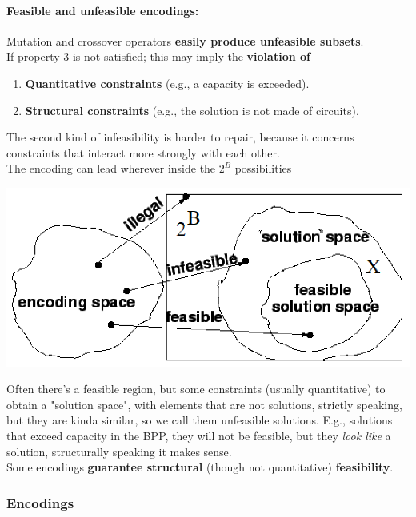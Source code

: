 \paragraph{Feasible and unfeasible encodings:} Mutation and crossover operators \textbf{easily produce unfeasible subsets}.\\

If property 3 is not satisfied; this may imply the \textbf{violation of}
\begin{enumerate}
	\item \textbf{Quantitative constraints} (e.g., a capacity is exceeded).\\
	
	\item \textbf{Structural constraints} (e.g., the solution is not made of circuits).\\
\end{enumerate}

The second kind of infeasibility is harder to repair, because it concerns constraints that interact more strongly with each other.\\

The encoding can lead wherever inside the $2^B$ possibilities
\begin{center}
	\includegraphics[width=0.75\columnwidth]{img/feasible1}
\end{center}
Often there's a feasible region, but some constraints (usually quantitative) to obtain a "solution space", with elements that are not solutions, strictly speaking, but they are kinda similar, so we call them unfeasible solutions. E.g., solutions that exceed capacity in the BPP, they will not be feasible, but they \textit{look like} a solution, structurally speaking it makes sense.\\

Some encodings \textbf{guarantee structural} (though not quantitative) \textbf{feasibility}.\\

\newpage

\subsubsection{Encodings}

